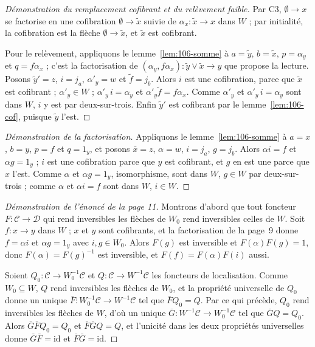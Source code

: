 \begin{proof}[Démonstration du remplacement cofibrant et du relèvement faible]
Par C3, $\emptyset \to x$ se factorise en une cofibration $\emptyset \to \widetilde x$ suivie de $\alpha_x : \widetilde x \to x$ dans $W$ ; par initialité, la cofibration est la flèche $\emptyset \to \widetilde x$, et $\widetilde x$ est cofibrant.

Pour le relèvement, appliquons le lemme~\ref{lem:106-somme} à $a = \widetilde y$, $b = \widetilde x$, $p = \alpha_y$ et $q = f \alpha_x$ ; c'est la factorisation de $(\alpha_y, f\alpha_x) : \widetilde y \vee \widetilde x \to y$ que propose la lecture. Posons $\widetilde y' = z$, $i = j_a$, $\alpha'_y = w$ et $\widetilde f = j_b$. Alors $i$ est une cofibration, parce que $\widetilde x$ est cofibrant ; $\alpha'_y \in W$ ; $\alpha'_y\, i = \alpha_y$ et $\alpha'_y \widetilde f = f\alpha_x$. Comme $\alpha'_y$ et $\alpha'_y\, i = \alpha_y$ sont dans $W$, $i$ y est par deux-sur-trois. Enfin $\widetilde y'$ est cofibrant par le lemme~\ref{lem:106-cof}, puisque $\widetilde y$ l'est.
\end{proof}

\begin{proof}[Démonstration de la factorisation]
Appliquons le lemme~\ref{lem:106-somme} à $a = x$, $b = y$, $p = f$ et $q = 1_y$, et posons $\bar x = z$, $\alpha = w$, $i = j_a$, $g = j_b$. Alors $\alpha i = f$ et $\alpha g = 1_y$ ; $i$ est une cofibration parce que $y$ est cofibrant, et $g$ en est une parce que $x$ l'est. Comme $\alpha$ et $\alpha g = 1_y$, isomorphisme, sont dans $W$, $g \in W$ par deux-sur-trois ; comme $\alpha$ et $\alpha i = f$ sont dans $W$, $i \in W$.
\end{proof}

\begin{proof}[Démonstration de l'énoncé de la page 11]
Montrons d'abord que tout foncteur $F : \mathcal C \to \mathcal D$ qui rend inversibles les flèches de $W_0$ rend inversibles celles de $W$. Soit $f : x \to y$ dans $W$ ; $x$ et $y$ sont cofibrants, et la factorisation de la page~9 donne $f = \alpha i$ et $\alpha g = 1_y$ avec $i, g \in W_0$. Alors $F(g)$ est inversible et $F(\alpha) F(g) = 1$, donc $F(\alpha) = F(g)^{-1}$ est inversible, et $F(f) = F(\alpha) F(i)$ aussi.

Soient $Q_0 : \mathcal C \to W_0^{-1}\mathcal C$ et $Q : \mathcal C \to W^{-1}\mathcal C$ les foncteurs de localisation. Comme $W_0 \subseteq W$, $Q$ rend inversibles les flèches de $W_0$, et la propriété universelle de $Q_0$ donne un unique $\bar F : W_0^{-1}\mathcal C \to W^{-1}\mathcal C$ tel que $\bar F Q_0 = Q$. Par ce qui précède, $Q_0$ rend inversibles les flèches de $W$, d'où un unique $\bar G : W^{-1}\mathcal C \to W_0^{-1}\mathcal C$ tel que $\bar G Q = Q_0$. Alors $\bar G \bar F Q_0 = Q_0$ et $\bar F \bar G Q = Q$, et l'unicité dans les deux propriétés universelles donne $\bar G \bar F = \mathrm{id}$ et $\bar F \bar G = \mathrm{id}$.
\end{proof}

